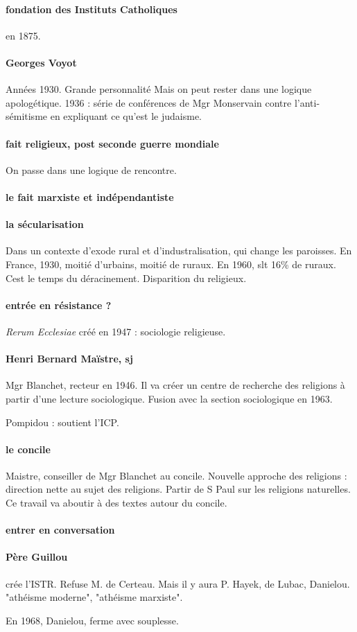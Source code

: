 \paragraph{fondation des Instituts Catholiques} en 1875.  

\paragraph{Georges Voyot} Années 1930. Grande personnalité
Mais on peut rester dans une logique apologétique. 1936 : série de conférences de Mgr Monservain contre l'anti-sémitisme en expliquant ce qu'est le judaisme.


\paragraph{fait religieux, post seconde guerre mondiale} On passe dans une logique de rencontre.

\paragraph{le fait marxiste et indépendantiste}

\paragraph{la sécularisation}

Dans un contexte d'exode rural et d'industralisation, qui change les paroisses. En France, 1930, moitié d'urbains, moitié de ruraux.
En 1960, slt 16\% de ruraux. Cest le temps du déracinement. Disparition du religieux. 

\paragraph{entrée en résistance ?} \textit{Rerum Ecclesiae} créé en 1947 : sociologie religieuse. 

\paragraph{Henri Bernard Maïstre, sj} Mgr Blanchet, recteur en 1946. Il va créer un centre de recherche des religions à partir d'une lecture sociologique. Fusion avec la section sociologique en 1963.

Pompidou : soutient l'ICP. 

\paragraph{le concile} Maistre, conseiller de Mgr Blanchet au concile.
Nouvelle approche des religions : direction nette au sujet des religions. Partir de S Paul sur les religions naturelles. Ce travail va aboutir à des textes autour du concile.

\paragraph{entrer en conversation}

\paragraph{Père Guillou} crée l'ISTR. Refuse M. de Certeau. Mais il y aura P. Hayek, de Lubac, Danielou. "athéisme moderne", "athéisme marxiste". 

En 1968, Danielou, ferme avec souplesse.






